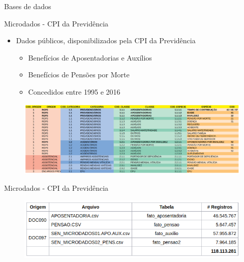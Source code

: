 \begin{frame}{Bases de dados}
  \begin{block}{Microdados - CPI da Previdência}
    \begin{itemize}
      \item Dados públicos, disponibilizados pela CPI da Previdência
    \begin{itemize}
      \item Benefícios de \alert{Aposentadorias} e \alert{Auxílios}
       \item Benefícios de \alert{Pensões por Morte}
       \item Concedidos entre 1995 e 2016
    \end{itemize}
  \end{itemize}
  \end{block}
  \begin{figure}[h]
  	\begin{center}
      \includegraphics [scale=0.27]{./Figures/PrevbrClassificacao}
  	\end{center}
  \end{figure}
\end{frame}

\begin{frame}
  \begin{block}{Microdados - CPI da Previdência}
  \begin{figure}[h]
  	\begin{center}
      \includegraphics [scale=0.45]{./Figures/microdados}
  	\end{center}
  \end{figure}
  \end{block}
\end{frame}

